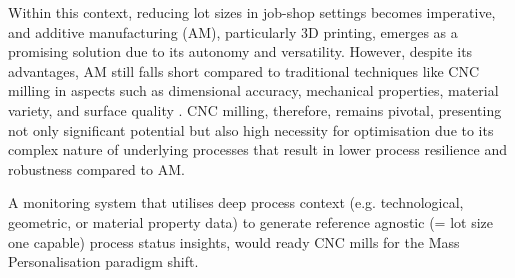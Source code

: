 \documentclass[5p,times,procedia]{elsarticle}
\newenvironment{note}{%
	\noindent
    \color{notecolor}%
}{%
    \par\medskip%
}
\begin{document}

Within this context, reducing lot sizes in job-shop settings becomes imperative, and additive manufacturing (AM), particularly 3D printing, emerges as a promising solution due to its autonomy and versatility.
However, despite its advantages, AM still falls short compared to traditional techniques like CNC milling in aspects such as dimensional accuracy, mechanical properties, material variety, and surface quality \cite{Chen.Lin2017,zotero-232,zotero-236}.
CNC milling, therefore, remains pivotal, presenting not only significant potential but also high necessity for optimisation due to its complex nature of underlying processes that result in lower process resilience and robustness compared to AM.

\begin{nomenclature}
\begin{deflist}[AAA]%
\end{deflist}
\end{nomenclature}%


A monitoring system that utilises deep process context (e.g. technological, geometric, or material property data) to generate reference agnostic (= lot size one capable) process status insights, would ready CNC mills for the Mass Personalisation paradigm shift.
\end{document}
